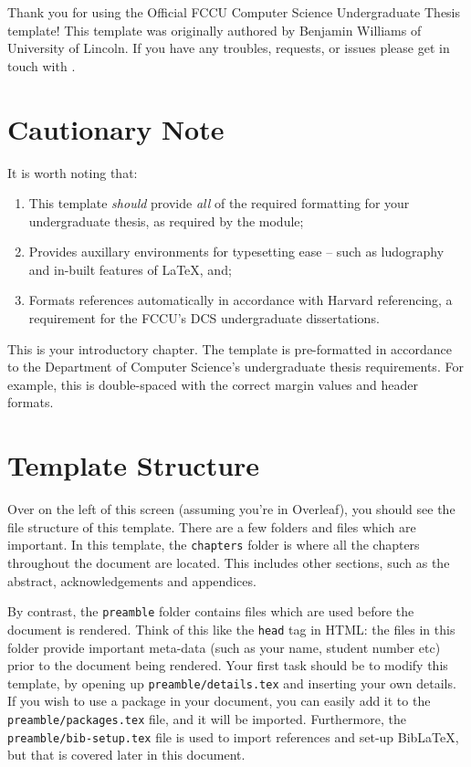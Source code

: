 Thank you for using the Official FCCU Computer Science Undergraduate Thesis template! This template was originally authored by Benjamin Williams of University of Lincoln. If you have any troubles, requests, or issues please get in touch with .

\section{Cautionary Note}
It is worth noting that:

\begin{enumerate}
    \item This template \emph{should} provide \emph{all} of the required formatting for your undergraduate thesis, as required by the module;
    \item Provides auxillary environments for typesetting ease -- such as ludography and in-built features of \LaTeX, and;
    \item Formats references automatically in accordance with Harvard referencing, a requirement for the FCCU's DCS undergraduate dissertations.
\end{enumerate}


This is your introductory chapter. The template is pre-formatted in accordance to the Department of Computer Science's undergraduate thesis requirements. For example, this is double-spaced with the correct margin values and header formats. 

\section{Template Structure}
Over on the left of this screen (assuming you're in Overleaf), you should see the file structure of this template. There are a few folders and files which are important. In this template, the \texttt{chapters} folder is where all the chapters throughout the document are located. This includes other sections, such as the abstract, acknowledgements and appendices.

By contrast, the \texttt{preamble} folder contains files which are used before the document is rendered. Think of this like the \texttt{head} tag in HTML: the files in this folder provide important meta-data (such as your name, student number etc) prior to the document being rendered. Your first task should be to modify this template, by opening up \texttt{preamble/details.tex} and inserting your own details. If you wish to use a package in your document, you can easily add it to the \texttt{preamble/packages.tex} file, and it will be imported.  Furthermore, the \texttt{preamble/bib-setup.tex} file is used to import references and set-up Bib\LaTeX, but that is covered later in this document.


